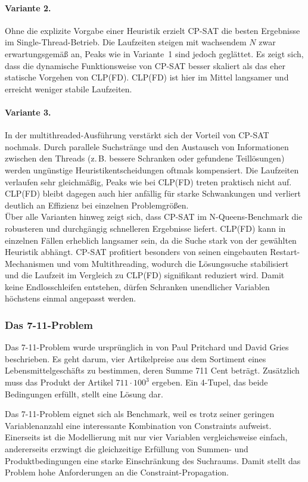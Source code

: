 \documentclass[12pt,a4paper]{article}
\begin{document}
\paragraph{Variante 2.}
Ohne die explizite Vorgabe einer Heuristik erzielt CP-SAT die besten Ergebnisse im Single-Thread-Betrieb. 
Die Laufzeiten steigen mit wachsendem $N$ zwar erwartungsgemäß an, Peaks wie in Variante~1 sind jedoch geglättet. 
Es zeigt sich, dass die dynamische Funktionsweise von CP-SAT besser skaliert als das eher statische Vorgehen von CLP(FD).
CLP(FD) ist hier im Mittel langsamer und erreicht weniger stabile Laufzeiten.
\paragraph{Variante 3.}
In der multithreaded-Ausführung verstärkt sich der Vorteil von CP-SAT nochmals. 
Durch parallele Suchstränge und den Austausch von Informationen zwischen den Threads (z.\,B. bessere Schranken oder gefundene Teillösungen) werden ungünstige Heuristikentscheidungen oftmals kompensiert. 
Die Laufzeiten verlaufen sehr gleichmäßig, Peaks wie bei CLP(FD) treten praktisch nicht auf. 
CLP(FD) bleibt dagegen auch hier anfällig für starke Schwankungen und verliert deutlich an Effizienz bei einzelnen Problemgrößen. 
\\

\noindent
Über alle Varianten hinweg zeigt sich, dass CP-SAT im N-Queens-Benchmark die robusteren und durchgängig schnelleren Ergebnisse liefert. 
CLP(FD) kann in einzelnen Fällen erheblich langsamer sein, da die Suche stark von der gewählten Heuristik abhängt. 
CP-SAT profitiert besonders von seinen eingebauten Restart-Mechanismen und vom Multithreading, wodurch die Lösungssuche stabilisiert und die Laufzeit im Vergleich zu CLP(FD) signifikant reduziert wird.
Damit keine Endlosschleifen entstehen, dürfen Schranken unendlicher Variablen höchstens einmal angepasst werden.
\subsubsection{Das 7-11-Problem}
Das 7-11-Problem wurde ursprünglich in \cite{seven_eleven} von Paul Pritchard und David Gries beschrieben.
Es geht darum, vier Artikelpreise aus dem Sortiment eines Lebensmittelgeschäfts zu bestimmen, deren Summe 711 Cent beträgt.
Zusätzlich muss das Produkt der Artikel $711 \cdot 100^3$ ergeben.
Ein 4-Tupel, das beide Bedingungen erfüllt, stellt eine Lösung dar. 

Das 7-11-Problem eignet sich als Benchmark, weil es trotz seiner geringen Variablenanzahl eine interessante Kombination von Constraints aufweist.
Einerseits ist die Modellierung mit nur vier Variablen vergleichsweise einfach, andererseits erzwingt die gleichzeitige Erfüllung von Summen- und Produktbedingungen eine starke Einschränkung des Suchraums.
Damit stellt das Problem hohe Anforderungen an die Constraint-Propagation.
\end{document}
